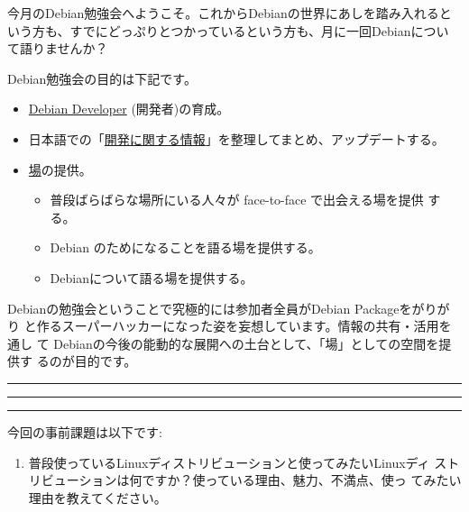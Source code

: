 \documentclass[mingoth,a4paper]{jsarticle}
\begin{document}
\begin{multicols}{2}
 
 
 今月のDebian勉強会へようこそ。これからDebianの世界にあしを踏み入れると
 いう方も、すでにどっぷりとつかっているという方も、月に一回Debianについ
 て語りませんか？

 Debian勉強会の目的は下記です。

 \begin{itemize}
 \item \underline{Debian Developer} (開発者)の育成。
 \item 日本語での「\underline{開発に関する情報}」を整理してまとめ、アップデートする。
 \item \underline{場}の提供。
 \begin{itemize}
  \item 普段ばらばらな場所にいる人々が face-to-face で出会える場を提供
	する。
  \item Debian のためになることを語る場を提供する。
  \item Debianについて語る場を提供する。
 \end{itemize}
 \end{itemize}		

 Debianの勉強会ということで究極的には参加者全員がDebian Packageをがりがり
 と作るスーパーハッカーになった姿を妄想しています。情報の共有・活用を通し
 て Debianの今後の能動的な展開への土台として、「場」としての空間を提供す
 るのが目的です。

\end{multicols}

\newpage

\begin{minipage}[b]{0.2\hsize}
 \colorbox{titleback}{}
\end{minipage}
\begin{minipage}[b]{0.8\hsize}
\hrule
\vspace{2mm}
\hrule
\tableofcontents
\vspace{2mm}
\hrule
\end{minipage}


今回の事前課題は以下です:

\begin{enumerate}
 \item 普段使っているLinuxディストリビューションと使ってみたいLinuxディ
       ストリビューションは何ですか？使っている理由、魅力、不満点、使っ
       てみたい理由を教えてください。
\end{enumerate}
\end{document}
